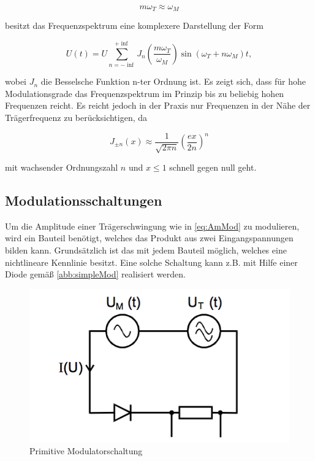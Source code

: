 \begin{equation}
m\omega_T \approx \omega_M
\end{equation}

besitzt das Frequenzspektrum eine komplexere Darstellung der Form

\begin{equation}
U(t) = U \sum_{n=-\inf}^{+\inf} J_{n}(\frac{m\omega_T}{\omega_M})\sin(\omega_T + n\omega_M)t,
\end{equation}

wobei $J_n$ die Besselsche Funktion n-ter Ordnung ist. Es zeigt sich, dass für hohe Modulationsgrade das Frequenzspektrum im Prinzip bis zu beliebig hohen Frequenzen reicht. Es reicht jedoch in der Praxis nur Frequenzen in der Nähe der Trägerfrequenz zu berücksichtigen, da

\begin{equation}
J_{\pm n}(x) \approx \frac{1}{\sqrt{2\pi n}}(\frac{ex}{2n})^n
\end{equation}

mit wachsender Ordnungszahl $n$ und $x \leq 1$ schnell gegen null geht.

\subsection{Modulationsschaltungen}
Um die Amplitude einer Trägerschwingung wie in \autoref{eq:AmMod} zu modulieren, wird ein Bauteil benötigt, welches das Produkt aus zwei Eingangspannungen bilden kann. Grundsätzlich ist das mit jedem Bauteil möglich, welches eine nichtlineare Kennlinie besitzt.
Eine solche Schaltung kann z.B. mit Hilfe einer Diode gemäß \autoref{abb:simpleMod} realisiert werden.

\begin{figure}
	\centering
	\includegraphics[width=\textwidth]{img/Abb4.png}
	\caption{Primitive Modulatorschaltung \cite{FP}}
	\label{abb:simpleMod}
\end{figure}

